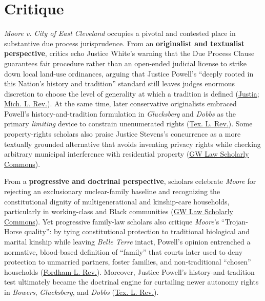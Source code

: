 \documentclass[12pt]{article}
\begin{document}
\section{Critique}
\textit{Moore v. City of East Cleveland} occupies a pivotal and contested place in substantive due process jurisprudence. From an \textbf{originalist and textualist perspective}, critics echo Justice White's warning that the Due Process Clause guarantees fair procedure rather than an open-ended judicial license to strike down local land-use ordinances, arguing that Justice Powell's ``deeply rooted in this Nation's history and tradition'' standard still leaves judges enormous discretion to choose the level of generality at which a tradition is defined (\href{https://supreme.justia.com/cases/federal/us/431/494/}{Justia}; \href{https://repository.law.umich.edu/cgi/viewcontent.cgi?article=4069&context=facarticles}{Mich. L. Rev.}). At the same time, later conservative originalists embraced Powell's history-and-tradition formulation in \textit{Glucksberg} and \textit{Dobbs} as the primary \textit{limiting} device to constrain unenumerated rights (\href{https://texaslawreview.org/in-defense-of-substantive-due-process/}{Tex. L. Rev.}). Some property-rights scholars also praise Justice Stevens's concurrence as a more textually grounded alternative that avoids inventing privacy rights while checking arbitrary municipal interference with residential property (\href{https://scholarship.law.gwu.edu/cgi/viewcontent.cgi?article=2515&context=faculty_publications}{GW Law Scholarly Commons}).

From a \textbf{progressive and doctrinal perspective}, scholars celebrate \textit{Moore} for rejecting an exclusionary nuclear-family baseline and recognizing the constitutional dignity of multigenerational and kinship-care households, particularly in working-class and Black communities (\href{https://scholarship.law.gwu.edu/cgi/viewcontent.cgi?article=2515&context=faculty_publications}{GW Law Scholarly Commons}). Yet progressive family-law scholars also critique \textit{Moore}'s ``Trojan-Horse quality'': by tying constitutional protection to traditional biological and marital kinship while leaving \textit{Belle Terre} intact, Powell's opinion entrenched a normative, blood-based definition of ``family'' that courts later used to deny protection to unmarried partners, foster families, and non-traditional ``chosen'' households (\href{https://fordhamlawreview.org/wp-content/uploads/2017/04/Carbone-Cahn_May.pdf}{Fordham L. Rev.}). Moreover, Justice Powell's history-and-tradition test ultimately became the doctrinal engine for curtailing newer autonomy rights in \textit{Bowers}, \textit{Glucksberg}, and \textit{Dobbs} (\href{https://texaslawreview.org/in-defense-of-substantive-due-process/}{Tex. L. Rev.}).
\end{document}

